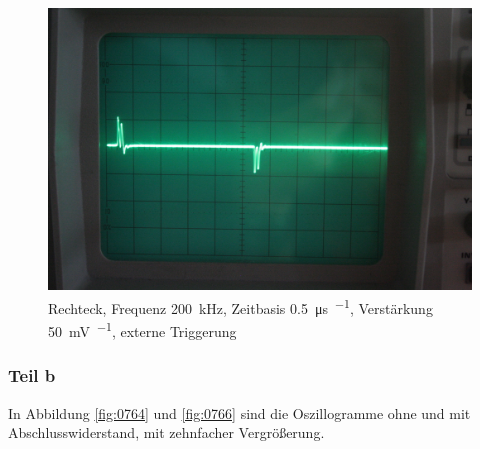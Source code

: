 \begin{figure}
	\centering
	\begin{minipage}{.45\linewidth}
	\end{minipage}
	\hfill
	\begin{minipage}{.45\linewidth}
	\includegraphics[width=\linewidth]{Fotos/IMG_0765-1500.jpg}
	\end{minipage}
	\caption{%
		Rechteck, Frequenz \SI{200}{\kilo\hertz},
		Zeitbasis \SI{.5}{\micro\second\per\division},
		Verstärkung \SI{50}{\milli\volt\per\division},
		externe Triggerung
	}
	\label{fig:0765}
\end{figure}

\FloatBarrier
\subsubsection{Teil b}

In Abbildung \ref{fig:0764} und \ref{fig:0766} sind die Oszillogramme ohne und
mit Abschlusswiderstand, mit zehnfacher Vergrößerung.

